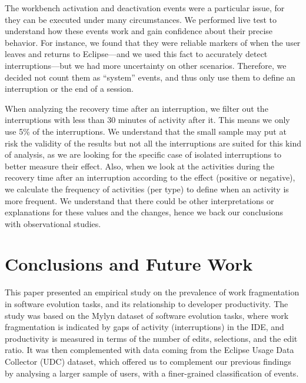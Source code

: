 \documentclass[times]{smrauth}
\begin{document}
The workbench activation and deactivation events were a particular issue, for they can be executed under many circumstances. We performed live test to understand how these events work and gain confidence about their precise behavior. For instance, we found that they were reliable markers of when the user leaves and returns to Eclipse---and we used this fact to accurately detect interruptions---but we had more uncertainty on other scenarios. Therefore, we decided not count them as ``system'' events, and thus only use them to define an interruption or the end of a session.


When analyzing the recovery time after an interruption, we filter out the interruptions with less than 30 minutes of activity after it. This means we only use 5\% of the interruptions. We understand that the small sample may put at risk the validity of the results but not all the interruptions are suited for this kind of analysis, as we are looking for the specific case of isolated interruptions to better measure their effect. Also, when we look at the activities during the recovery time after an interruption according to the effect (positive or negative), we calculate the frequency of activities (per type) to define when an activity is more frequent. We understand that there could be other interpretations or explanations for these values and the changes, hence we back our conclusions with observational studies.



\section{Conclusions and Future Work}
This paper presented an empirical study on the prevalence of work fragmentation in software evolution tasks, and its relationship to developer productivity. The study was based on the Mylyn dataset of software evolution tasks, where work fragmentation is indicated by gaps of activity (interruptions) in the IDE, and productivity is measured in terms of the number of edits, selections, and the edit ratio. It was then complemented with data coming from the Eclipse Usage Data Collector (UDC) dataset, which offered us to complement our previous findings by analysing a larger sample of users, with a finer-grained classification of events.
\end{document}
